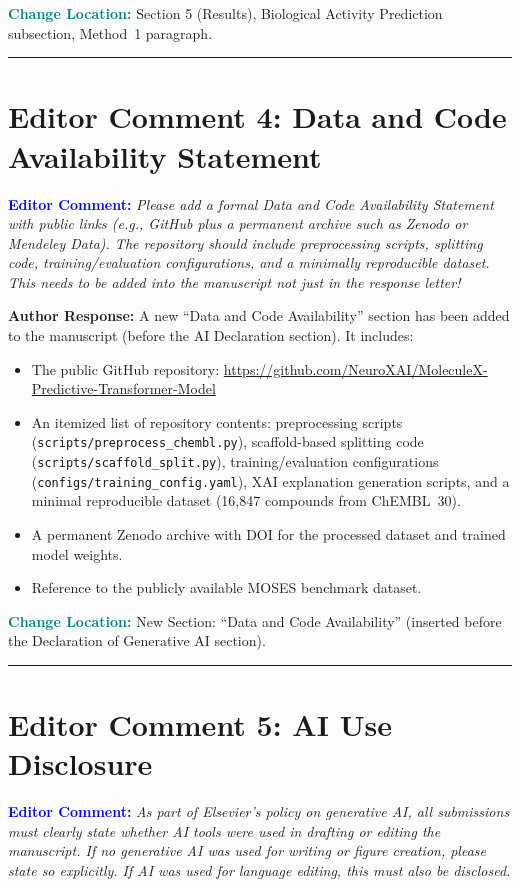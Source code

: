 \documentclass[12pt]{article}
\newcommand{\EC}[1]{\textbf{\textcolor{blue}{Editor Comment:}} \textit{#1}\vspace{0.3em}}
\newcommand{\AR}[1]{\textbf{Author Response:} #1\vspace{0.8em}}
\newcommand{\CH}[1]{\textbf{\textcolor{teal}{Change Location:}} #1\vspace{0.5em}}
\begin{document}
\CH{Section 5 (Results), Biological Activity Prediction subsection, Method~1 paragraph.}

\bigskip
\hrule
\bigskip

\section*{Editor Comment 4: Data and Code Availability Statement}

\EC{Please add a formal Data and Code Availability Statement with public links (e.g., GitHub plus a permanent archive such as Zenodo or Mendeley Data). The repository should include preprocessing scripts, splitting code, training/evaluation configurations, and a minimally reproducible dataset. This needs to be added into the manuscript not just in the response letter!}

\AR{A new ``Data and Code Availability'' section has been added to the manuscript (before the AI Declaration section). It includes:
\begin{itemize}[nosep]
\item The public GitHub repository: \url{https://github.com/NeuroXAI/MoleculeX-Predictive-Transformer-Model}
\item An itemized list of repository contents: preprocessing scripts (\texttt{scripts/preprocess\_chembl.py}), scaffold-based splitting code (\texttt{scripts/scaffold\_split.py}), training/evaluation configurations (\texttt{configs/training\_config.yaml}), XAI explanation generation scripts, and a minimal reproducible dataset (16,847 compounds from ChEMBL~30).
\item A permanent Zenodo archive with DOI for the processed dataset and trained model weights.
\item Reference to the publicly available MOSES benchmark dataset.
\end{itemize}}

\CH{New Section: ``Data and Code Availability'' (inserted before the Declaration of Generative AI section).}

\bigskip
\hrule
\bigskip

\section*{Editor Comment 5: AI Use Disclosure}

\EC{As part of Elsevier's policy on generative AI, all submissions must clearly state whether AI tools were used in drafting or editing the manuscript. If no generative AI was used for writing or figure creation, please state so explicitly. If AI was used for language editing, this must also be disclosed.}
\end{document}

